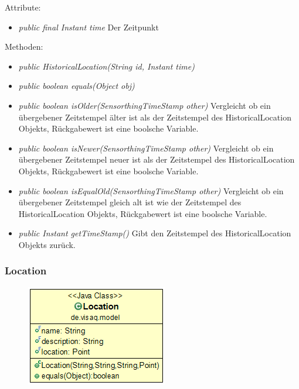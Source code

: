 Attribute:
\begin{itemize} 
	\item \emph{public final Instant time} Der Zeitpunkt
\end{itemize}
Methoden:
\begin{itemize} 
	\item \emph{public HistoricalLocation(String id, Instant time)} 
	\item \emph{public boolean equals(Object obj)} 
	\item \emph{public boolean isOlder(SensorthingTimeStamp other)} Vergleicht ob ein übergebener Zeitstempel älter ist als der Zeitstempel des HistoricalLocation Objekts, Rückgabewert ist eine boolsche Variable.
	\item \emph{public boolean isNewer(SensorthingTimeStamp other)} Vergleicht ob ein übergebener Zeitstempel neuer ist als der Zeitstempel des HistoricalLocation Objekts, Rückgabewert ist eine boolsche Variable.
	\item \emph{public boolean isEqualOld(SensorthingTimeStamp other)} Vergleicht ob ein übergebener Zeitstempel gleich alt ist wie der Zeitstempel des HistoricalLocation Objekts, Rückgabewert ist eine boolsche Variable.
	\item \emph{public Instant getTimeStamp()} Gibt den Zeitstempel des HistoricalLocation Objekts zurück.
\end{itemize}


\subsubsection {Location}
\begin{minipage}{0.3\textwidth}
	\begin{figure}[H]
		\includegraphics[scale = 0.5
		]{media/frontend/model/Location_Class.png}
	\end{figure}
\end{minipage} \hfill
\begin{minipage}{0.6\textwidth}
\end{minipage}

